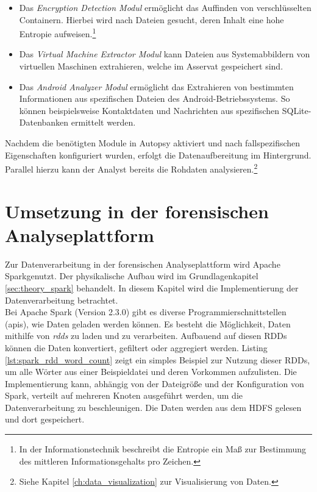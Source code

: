 \begin{itemize}
\item Das \textit{Encryption Detection Modul} ermöglicht das Auffinden von verschlüsselten Containern. Hierbei wird nach Dateien gesucht, deren Inhalt eine hohe Entropie aufweisen.\footnote{In der Informationstechnik beschreibt die Entropie ein Maß zur Bestimmung des mittleren Informationsgehalts pro Zeichen. 
}
\item Das \textit{Virtual Machine Extractor Modul} kann Dateien aus Systemabbildern von virtuellen Maschinen extrahieren, welche im Asservat gespeichert sind.
\item Das \textit{Android Analyzer Modul} ermöglicht das Extrahieren von bestimmten Informationen aus spezifischen Dateien des Android-Betriebssystems. So können beispielsweise Kontaktdaten und Nachrichten aus spezifischen SQLite-Datenbanken ermittelt werden.
\end{itemize}

\noindent
Nachdem die benötigten Module in Autopsy aktiviert und nach fallspezifischen Eigenschaften konfiguriert wurden, erfolgt die Datenaufbereitung im Hintergrund. Parallel hierzu kann der Analyst bereits die Rohdaten analysieren.\footnote{Siehe Kapitel \ref{ch:data_visualization} zur Visualisierung von Daten.}\\

\section{Umsetzung in der forensischen Analyseplattform}

Zur Datenverarbeitung in der forensischen Analyseplattform wird Apache Spark\texttrademark\thinspace genutzt. Der physikalische Aufbau wird im Grundlagenkapitel \ref{sec:theory_spark} behandelt. In diesem Kapitel wird die Implementierung der Datenverarbeitung betrachtet.\\ 

\noindent
Bei Apache Spark (Version 2.3.0) gibt es diverse Programmierschnittstellen (\acrshort{api}s), wie Daten geladen werden können. Es besteht die Möglichkeit, Daten mithilfe von \textit{\glspl{rdd}} zu laden und zu verarbeiten. Aufbauend auf diesen RDDs können die Daten konvertiert, gefiltert oder aggregiert werden.
Listing \ref{lst:spark_rdd_word_count} zeigt ein simples Beispiel zur Nutzung dieser RDDs, um alle Wörter aus einer Beispieldatei  und deren Vorkommen aufzulisten. Die Implementierung kann, abhängig von der Dateigröße und der Konfiguration von Spark, verteilt auf mehreren Knoten ausgeführt werden, um die Datenverarbeitung zu beschleunigen. Die Daten werden aus dem HDFS gelesen und dort gespeichert.

